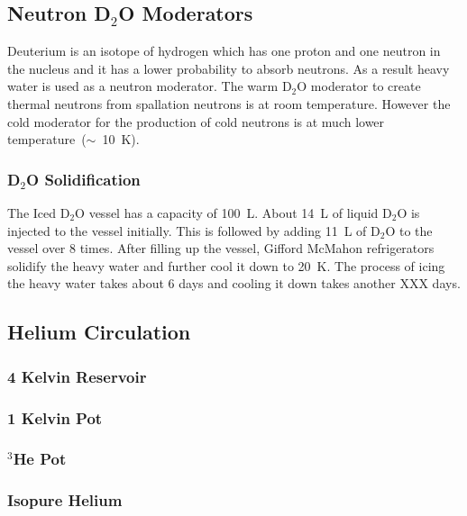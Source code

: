 \subsection{Neutron D$_2$O Moderators}
Deuterium is an isotope of hydrogen which has one proton and one
neutron in the nucleus and it has a lower probability to absorb
neutrons. As a result heavy water is used as a neutron moderator. The
warm D$_2$O moderator to create thermal neutrons from spallation
neutrons is at room temperature. However the cold moderator for the
production of cold neutrons is at much lower
temperature~($\sim$~10~K).

\subsubsection{D$_2$O Solidification}
The Iced D$_2$O vessel has a capacity of 100~L. About 14~L of liquid
D$_2$O is injected to the vessel initially. This is followed by adding 11~L of
D$_2$O to the vessel over 8 times.  After filling up the vessel,
Gifford McMahon refrigerators solidify the heavy water and further
cool it down to 20~K. The process of icing the heavy water takes about
6 days and cooling it down takes another XXX days.


\subsection{Helium Circulation}

\subsubsection{4 Kelvin Reservoir}

\subsubsection{1 Kelvin Pot}

\subsubsection{$^3$He Pot}

\subsubsection{Isopure Helium}


